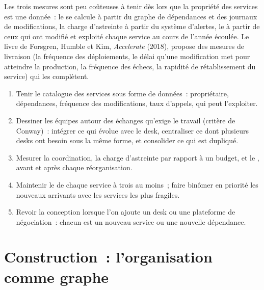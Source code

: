 Les trois mesures sont peu coûteuses à tenir dès lors que la propriété des services est une donnée~: le  se calcule à partir du graphe de dépendances et des journaux de modifications, la charge d'astreinte à partir du
système d'alertes, le  à partir de ceux qui ont modifié et exploité chaque service au cours de l'année écoulée. Le livre de Forsgren, Humble et Kim, \emph{Accelerate} (2018),
propose des mesures de livraison (la fréquence des déploiements, le délai qu'une modification met pour atteindre la production, la fréquence des échecs, la rapidité
de rétablissement du service) qui les complètent.

\begin{method}\label{met:fm:engineering-organisation-design:design}
\begin{enumerate}
\item Tenir le catalogue des services sous forme de données~: propriétaire, dépendances, fréquence des modifications, taux d'appels, qui peut l'exploiter.
\item Dessiner les équipes autour des échanges qu'exige le travail (critère de Conway)~: intégrer ce qui évolue avec le desk, centraliser ce dont plusieurs desks
ont besoin sous la même forme, et consolider ce qui est dupliqué.
\item Mesurer la coordination, la charge d'astreinte par rapport à un budget, et le , avant et après chaque réorganisation.
\item Maintenir le  de chaque service à trois au moins~; faire binômer en priorité les nouveaux arrivants avec les services les plus fragiles.
\item Revoir la conception lorsque l'on ajoute un desk ou une plateforme de négociation~: chacun est un nouveau service ou une nouvelle dépendance.
\end{enumerate}
\end{method}

\section{Construction~: l'organisation comme graphe}\label{bld:fm:engineering-organisation-design:teamtopo}

